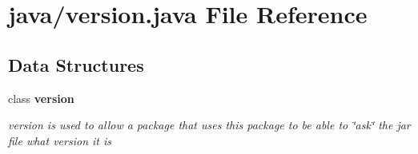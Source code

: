 \section{java/version.java File Reference}
\label{version_8java}
\subsection*{Data Structures}
\begin{DoxyCompactItemize}
\item 
class {\bf version}
\begin{DoxyCompactList}\small\item\em version is used to allow a package that uses this package to be able to \char`\"{}ask\char`\"{} the jar file what version it is \end{DoxyCompactList}\end{DoxyCompactItemize}

